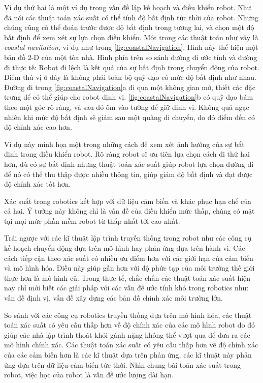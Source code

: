{Ví dụ thứ hai là một ví dụ trong vấn đề lập kế hoạch và điều khiển robot. Như đã nói các thuật toán xác suất có thể tính độ bất định tức thời của robot. Nhưng chúng cũng có thể đoán trước được độ bất định trong tương lai, và chọn một độ bất định để xem xét sự lựa chọn điều khiển. Một trong các thuật toán như vậy là \textit{coastal navitation}, ví dụ như trong \figurename{ \ref{fig:coastalNavigation}}. Hình này thể hiện một bản đồ 2-D của một tòa nhà. Hình phía trên so sánh đường đi ước tính và đường đi thực tế: Robot đi lệch là kết quả của sự bất định trong chuyển động của robot. Điểm thú vị ở đây là không phải toàn bộ quỹ đạo có mức độ bất định như nhau. Đường đi trong \figurename{ \ref{fig:coastalNavigation}}a đi qua một không gian mở, thiết các đặc trưng để có thể giúp cho robot định vị.  \figurename{ \ref{fig:coastalNavigation}}b có quỹ đạo bám theo một góc rõ ràng, và sau đó ôm vào tường để giữ định vị. Không quá ngạc nhiên khi mức độ bất định sẽ giảm sau một quãng di chuyển, do đó điểm đến có độ chính xác cao hơn.

Ví dụ này minh họa một trong những cách để xem xét ảnh hưởng của sự bất định trong điều khiển robot. Rõ ràng robot sẽ ưu tiên lựa chọn cách đi thứ hai hơn, dù có sự bất định nhưng thuật toán xác suất giúp robot lựa chọn đường đi để nó có thể thu thập được nhiều thông tin, giúp giảm độ bất định và đạt được độ chính xác tốt hơn.

Xác suất trong robotics kết hợp với dữ liệu cảm biến và khác phục hạn chế của cả hai. Ý tưởng này không chỉ là vấn đề của điều khiển mức thấp, chúng có mặt tại mọi mức phần mềm robot từ thấp nhất tới cao nhất.

Trái ngược với các kĩ thuật lập trình truyền thống trong robot như các công cụ kế hoạch chuyển động dựa trên mô hình hay phản ứng dựa trên hành vi. Các cách tiếp cận theo xác suất có nhiều ưu điểm hơn với các giới hạn của cảm biến và mô hình hóa. Điều này giúp gần hơn với độ phức tạp của môi trường thế giới thực hơn là mô hình cũ. Trong thực tế, chắc chắn các thuật toán xác suất hiện nay chỉ mới biết các giải pháp với các vấn đề ước tính khó trong robotics như: vấn đề định vị, vấn đề xây dựng các bản đồ chính xác môi trường lớn.

So sánh với các công cụ robotics truyền thống dựa trên mô hình hóa, các thuật toán xác suất có yêu cầu thấp hơn về độ chính xác của các mô hình robot do đó giúp các nhà lập trình thoát khỏi gánh nặng không thể vượt qua để đưa ra các mô hình chính xác. Các thuật toán xác suất có yêu cầu thấp hơn về độ chính xác của các cảm biến hơn là các kĩ thuật dựa trên phản ứng, các kĩ thuật này phản ứng dựa trên dữ liệu cảm biến tức thời. Nhìn chung bài toán xác suất trong robot, việc học của robot là vấn đề ước lượng dài hạn.

}
